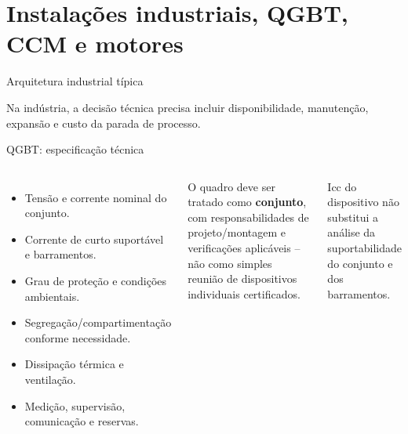 \section{Instalações industriais, QGBT, CCM e motores}

\begin{frame}{Arquitetura industrial típica}
\small
\centering
{}
\vspace{2mm}
\begin{caixaObs}
Na indústria, a decisão técnica precisa incluir disponibilidade, manutenção, expansão e custo da parada de processo.
\end{caixaObs}
\end{frame}

\begin{frame}{QGBT: especificação técnica}
\small
\begin{columns}[T,onlytextwidth]
\begin{itemize}
\item Tensão e corrente nominal do conjunto.
\item Corrente de curto suportável e barramentos.
\item Grau de proteção e condições ambientais.
\item Segregação/compartimentação conforme necessidade.
\item Dissipação térmica e ventilação.
\item Medição, supervisão, comunicação e reservas.
\end{itemize}
\begin{caixaNorma}[title=Série NBR IEC 61439]
O quadro deve ser tratado como \textbf{conjunto}, com responsabilidades de projeto/montagem e verificações aplicáveis -- não como simples reunião de dispositivos individuais certificados.
\end{caixaNorma}
\begin{caixaAt}
Icc do dispositivo não substitui a análise da suportabilidade do conjunto e dos barramentos.
\end{caixaAt}
\end{columns}
\end{frame}

